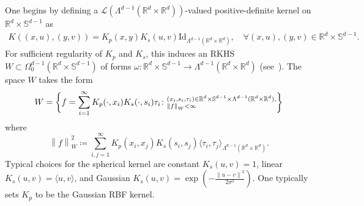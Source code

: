 \documentclass[sn-mathphys-num]{sn-jnl}%
\theoremstyle{thmstyleone}%
\theoremstyle{thmstyletwo}%
\theoremstyle{thmstylethree}%
\numberwithin{remark}{section}
\numberwithin{definition}{section}
\numberwithin{equation}{section}
\numberwithin{theorem}{section}
\newcommand{\norm}[1]{\left\lVert#1\right\rVert}
\newcommand{\R}{\ensuremath{\mathbb{R}}}%
\begin{document}
One begins by defining a $\mathcal{L}(\Lambda^{d-1}(\R^{d}\times  \R^{d}))$-valued positive-definite kernel on $\R^{d} \times \mathbb{S}^{d-1}$ as
\begin{align}\label{productkernel}
    K((x,u),(y,v)) = K_{p}(x,y)K_{s}(u,v)\mathrm{Id}_{\Lambda^{d-1}(\R^{d}\times  \R^{d})},\quad \forall (x,u),(y,v)\in \R^{d}\times \mathbb{S}^{d-1}.
\end{align}
For sufficient regularity of $K_{p}$ and $K_{s}$, this induces an RKHS $W\subset \Omega_{0}^{d-1}(\R^{d}\times \mathbb{S}^{d-1})$ of forms $\omega \colon \R^{d}\times \mathbb{S}^{d-1} \to \Lambda^{d-1}(\R^{d}\times  \R^{d})$ (see~\cite{NCpaper, NCThesis}). The space $W$ takes the form
\begin{equation}\label{embeddingspace}
W = \bigg\{f = \sum_{i=1}^{\infty}{K_{p}(\cdot,x_{i})K_{s}(\cdot,s_{i})\tau_{i} }\colon \begin{subarray}{l}(x_{i},s_{i},\tau_{i}) \in \R^{d}\times \mathbb{S}^{d-1}\times \Lambda^{d-1}(\R^{d}\times  \R^{d}),\\ \norm{f}_{W}<\infty\end{subarray}\bigg\}
\end{equation}
where
\[
\norm{f}_{W}^{2}\coloneqq\sum_{i,j=1}^{\infty}{K_{p}(x_{i},x_{j})K_{s}(s_{i},s_{j})\langle \tau_{i},\tau_{j}\rangle_{\Lambda^{d-1}(\R^{d}\times  \R^{d}) } }.
\]
Typical choices for the spherical kernel are constant $K_{s}(u,v) = 1$, linear $K_{s}(u,v) = \langle u,v\rangle$, and Gaussian $K_{s}(u,v) = \exp(-\frac{\norm{u-v}^{2}}{2\sigma^{2}})$. One typically sets $K_{p}$ to be the Gaussian RBF kernel. 
\end{document}
